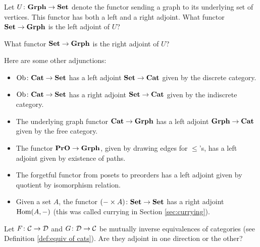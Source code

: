 \documentclass[CT4S-EN-RU]{subfiles}
\begin{document}
\begin{exampleRUS}
\end{exampleRUS}

\begin{exerciseENG}
Let $U\colon{\mathbf{Grph}}\rightarrow{\mathbf{Set}}$ denote the functor sending a graph to its underlying set of vertices. This functor has both a left and a right adjoint. 
\sexc What functor ${\mathbf{Set}}\rightarrow{\mathbf{Grph}}$ is the left adjoint of $U$?
\item What functor ${\mathbf{Set}}\rightarrow{\mathbf{Grph}}$ is the right adjoint of $U$?
\endsexc
\end{exerciseENG}

\begin{exerciseRUS}
\end{exerciseRUS}

\begin{exampleENG}\label{ex:other adjunctions}
Here are some other adjunctions:

\begin{itemize}
\item $\textnormal{Ob}\colon{\mathbf{Cat}}\rightarrow{\mathbf{Set}}$ has a left adjoint ${\mathbf{Set}}\rightarrow{\mathbf{Cat}}$ given by the discrete category.
\item $\textnormal{Ob}\colon{\mathbf{Cat}}\rightarrow{\mathbf{Set}}$ has a right adjoint ${\mathbf{Set}}\rightarrow{\mathbf{Cat}}$ given by the indiscrete category.
\item The underlying graph functor ${\mathbf{Cat}}\rightarrow{\mathbf{Grph}}$ has a left adjoint ${\mathbf{Grph}}\rightarrow{\mathbf{Cat}}$ given by the free category.
\item The functor ${\mathbf{PrO}}\rightarrow{\mathbf{Grph}}$,  given by drawing edges for $\leq$'s, has a left adjoint given by existence of paths.
\item The forgetful functor from posets to preorders has a left adjoint given by quotient by isomorphism relation.
\item Given a set $A$, the functor $(-\times A)\colon{\mathbf{Set}}\rightarrow{\mathbf{Set}}$ has a right adjoint $\textnormal{Hom}(A,-)$ (this was called currying in Section \ref{sec:currying}). 
\end{itemize}
\end{exampleENG}

\begin{exampleRUS}\label{ex:other adjunctions}
\end{exampleRUS}

\begin{exerciseENG}
Let $F\colon\mathcal{C}\rightarrow\mathcal{D}$ and $G\colon\mathcal{D}\rightarrow\mathcal{C}$ be mutually inverse equivalences of categories (see Definition \ref{def:equiv of cats}). Are they adjoint in one direction or the other?
\end{exerciseENG}
\end{document}
